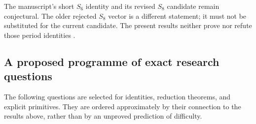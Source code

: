 The manuscript's short $S_6$ identity and its revised $S_8$ candidate
remain conjectural. The older rejected $S_8$ vector is a different
statement; it must not be substituted for the current candidate. The
present results neither prove nor refute those period identities
\cite[README and editorial ledger]{Repo}.

\subsection{A proposed programme of exact research questions}

The following questions are selected for identities, reduction theorems,
and explicit primitives. They are ordered approximately by their
connection to the results above, rather than by an unproved prediction
of difficulty.

